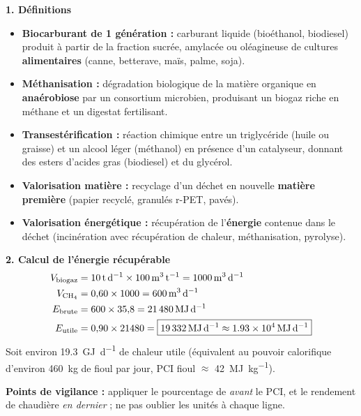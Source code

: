 \documentclass[11pt]{article}
\begin{document}
\begin{corrige}
\textbf{1. Définitions}
\begin{itemize}
    \item \textbf{Biocarburant de 1 génération :} carburant liquide (bioéthanol, biodiesel) produit à partir de la fraction sucrée, amylacée ou oléagineuse de cultures \textbf{alimentaires} (canne, betterave, maïs, palme, soja).
    \item \textbf{Méthanisation :} dégradation biologique de la matière organique en \textbf{anaérobiose} par un consortium microbien, produisant un biogaz riche en méthane et un digestat fertilisant.
    \item \textbf{Transestérification :} réaction chimique entre un triglycéride (huile ou graisse) et un alcool léger (méthanol) en présence d'un catalyseur, donnant des esters d'acides gras (biodiesel) et du glycérol.
    \item \textbf{Valorisation matière :} recyclage d'un déchet en nouvelle \textbf{matière première} (papier recyclé, granulés r-PET, pavés).
    \item \textbf{Valorisation énergétique :} récupération de l'\textbf{énergie} contenue dans le déchet (incinération avec récupération de chaleur, méthanisation, pyrolyse).
\end{itemize}

\textbf{2. Calcul de l'énergie récupérable}
\begin{align*}
V_{\text{biogaz}} &= \SI{10}{\tonne\per\day} \times \SI{100}{\cubic\meter\per\tonne} = \SI{1000}{\cubic\meter\per\day} \\
V_{\ce{CH4}} &= 0{,}60 \times 1000 = \SI{600}{\cubic\meter\per\day} \\
E_{\text{brute}} &= 600 \times 35{,}8 = \SI{21480}{\mega\joule\per\day} \\
E_{\text{utile}} &= 0{,}90 \times 21480 = \boxed{\SI{19332}{\mega\joule\per\day} \approx \SI{1,93e4}{\mega\joule\per\day}}
\end{align*}
Soit environ \SI{19,3}{\giga\joule\per\day} de chaleur utile (équivalent au pouvoir calorifique d'environ \SI{460}{\kilogram} de fioul par jour, PCI fioul $\approx$ \SI{42}{\mega\joule\per\kilogram}).

\textbf{Points de vigilance :} appliquer le pourcentage de  \emph{avant} le PCI, et le rendement de chaudière \emph{en dernier} ; ne pas oublier les unités à chaque ligne.
\end{corrige}
\end{document}
